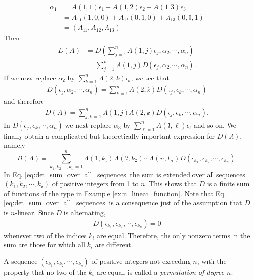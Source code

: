 \documentclass[12pt,letterpaper,reqno]{article}
\numberwithin{equation}{section}
\newcommand{\ti}[1]{\textit{#1}}
\begin{document}
\begin{align*}
\alpha_1&=A(1,1)\epsilon_1+A(1,2)\epsilon_2+A(1,3)\epsilon_3 \\
&=A_{11}(1,0,0)+A_{12}(0,1,0)+A_{13}(0,0,1) \\
&=(A_{11},A_{12},A_{13})
\end{align*}
Then
\begin{align*}
	D(A)&=D\left(\sum_{j=1}^nA(1,j)\epsilon_j,\alpha_2,\cdots,\alpha_n\right) \\
	&=\sum_{j=1}^nA(1,j)D\left(\epsilon_j,\alpha_2,\cdots,\alpha_n\right).
\end{align*}
If we now replace $\alpha_2$ by $\sum_{k=1}^n A(2,k)\epsilon_k$, we see that 
\begin{align*}
	D(\epsilon_j,\alpha_2,\cdots,\alpha_n)=\sum_{k=1}^nA(2,k)D(\epsilon_j,\epsilon_k,\cdots,\alpha_n)
\end{align*}
and therefore
\begin{align*}
	D(A)=\sum_{j,k=1}^nA(1,j)A(2,k)D(\epsilon_j,\epsilon_k,\cdots,\alpha_n).
\end{align*}
In $D(\epsilon_j,\epsilon_k,\cdots,\alpha_n)$ we next replace $\alpha_3$ by $\sum_{\ell=1}^nA(3,\ell)\epsilon_\ell$ and so on. We finally obtain a complicated but theoretically important expression for $D(A)$, namely
\begin{equation}\label{eq:det_sum_over_all_sequences}
	D(A)=\sum_{k_1,k_2,\cdots,k_n=1}^nA(1,k_1)A(2,k_2)\cdots A(n,k_n)D(\epsilon_{k_1},\epsilon_{k_2},\cdots,\epsilon_{k_n}).
\end{equation}
In Eq. \eqref{eq:det_sum_over_all_sequences} the sum is extended over all sequences $(k_1,k_2,\cdots,k_n)$ of positive integers from 1 to $n$. This shows that $D$ is a finite sum of functions of the type in Example \ref{ex:n_linear_function}. Note that Eq. \eqref{eq:det_sum_over_all_sequences} is a consequence just of the assumption that $D$ is $n$-linear. Since $D$ is alternating,
\begin{align*}
	D(\epsilon_{k_1},\epsilon_{k_2},\cdots,\epsilon_{k_n})=0
\end{align*}
whenever two of the indices $k_i$ are equal. Therefore, the only nonzero terms in the sum are those for which all $k_i$ are different. 

\begin{defn}[Permutation]
	A sequence $(\epsilon_{k_1},\epsilon_{k_2},\cdots,\epsilon_{k_n})$ of positive integers not exceeding $n$, with the property that no two of the $k_i$ are equal, is called a \ti{permutation of degree $n$}.
\end{defn}
\end{document}
